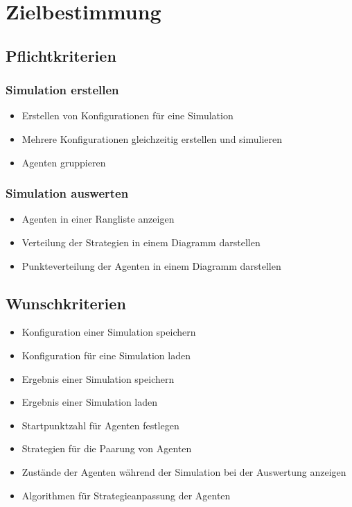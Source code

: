 \section{Zielbestimmung}

\subsection{Pflichtkriterien}

\subsubsection{Simulation erstellen}

\begin{itemize}
\item Erstellen von Konfigurationen für eine Simulation
\item Mehrere Konfigurationen gleichzeitig erstellen und simulieren
\item Agenten gruppieren
\end{itemize}

\subsubsection{Simulation auswerten}
\begin{itemize}
\item Agenten in einer Rangliste anzeigen
\item Verteilung der Strategien in einem Diagramm darstellen
\item Punkteverteilung der Agenten in einem Diagramm darstellen
\end{itemize}

\subsection{Wunschkriterien}
\begin{itemize}
\item Konfiguration einer Simulation speichern
\item Konfiguration für eine Simulation laden
\item Ergebnis einer Simulation speichern
\item Ergebnis einer Simulation laden
\item Startpunktzahl für Agenten festlegen
\item Strategien für die Paarung von Agenten
\item Zustände der Agenten während der Simulation bei der Auswertung anzeigen
\item Algorithmen für Strategieanpassung der Agenten
\end{itemize}

